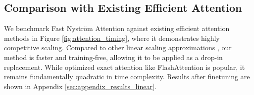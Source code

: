 \documentclass[10pt,twocolumn,letterpaper]{article}
\begin{document}
\begin{table}[t]
    \centering
    \footnotesize
    \vspace{-0.5em}
    \caption{Zero-shot retrieval time and performance results on COCO for CLIP ViT L-14 and its Fast Nyström Approximation (FNA) with different sampling strategies.}
    \label{tab:fna_sampling_results}
\end{table}










\subsection{Comparison with Existing Efficient Attention}
We benchmark Fast Nystr\"om Attention against existing efficient attention methods in Figure \ref{fig:attention_timing}, where it demonstrates highly competitive scaling. Compared to other linear scaling approximations \cite{choromanski2020performer} \cite{wang2020linformer}, our method is faster and training-free, allowing it to be applied as a drop-in replacement. While optimized exact attention like FlashAttention \cite{dao2024flashattention2} is popular, it remains fundamentally quadratic in time complexity. Results after finetuning are shown in Appendix \ref{sec:appendix_results_linear}.
\end{document}
